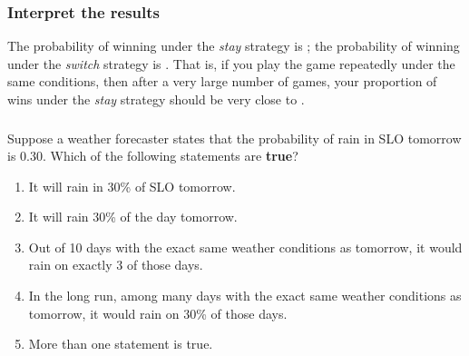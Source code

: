 \begin{frame}
\frametitle{Interpret the results}
The probability of winning under the \emph{stay} strategy is \underline{\hspace{0.5in}}; the probability of winning under the \emph{switch} strategy is \underline{\hspace{0.5in}}.
\vskip10pt
That is, if you play the game repeatedly under the same conditions, then after a very large number of games, your proportion of wins under the \emph{stay} strategy should be very close to \underline{\hspace{0.5in}}.
\end{frame}


\begin{frame}
\frametitle{\grp}
\begin{clicker}{Suppose a weather forecaster states that the probability of rain in SLO tomorrow is 0.30.  Which of the following statements are \textbf{true}?}
\begin{enumerate}
    \item
    It will rain in 30\% of SLO tomorrow.
    \item
    It will rain 30\% of the day tomorrow.
    \item
    Out of 10 days with the exact same weather conditions as tomorrow, it would rain on exactly 3 of those days.
    \item
    In the long run, among many days with the exact same weather conditions as tomorrow, it would rain on 30\% of those days.
    \item
    More than one statement is true.
\end{enumerate}
\end{clicker}
\end{frame}



